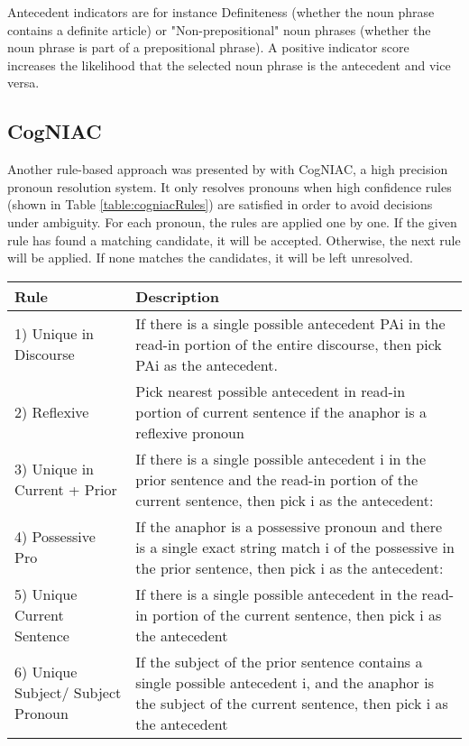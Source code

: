 Antecedent indicators are for instance Definiteness (whether the noun phrase contains a definite article) or "Non-prepositional" noun phrases (whether the noun phrase is part of a prepositional phrase). A positive indicator score increases the likelihood that the selected noun phrase is the antecedent and vice versa.


\subsection{CogNIAC}
Another rule-based approach was presented by \citep{baldwin1997cogniac} with CogNIAC, a high precision pronoun resolution system. It only resolves pronouns when high confidence rules (shown in Table \ref{table:cogniacRules})  are satisfied in order to avoid decisions under ambiguity. For each pronoun, the rules are applied one by one. If the given rule has found a matching candidate, it will be accepted. Otherwise, the next rule will be applied. If none matches the candidates, it will be left unresolved. 


\begin{center}
    \begin{tabular}{| l |p{8cm} |}

    \hline
    Rule & Description \\ \hline
\hline
    1) Unique in Discourse & If there is a single possible antecedent PAi in the read-in portion of the entire discourse, then pick PAi as the antecedent. \\ \hline
    2) Reflexive & Pick nearest possible antecedent in read-in portion of current sentence if the anaphor is a reflexive pronoun \\ \hline
    3) Unique in Current + Prior & If there is a single possible antecedent i in the prior sentence and the read-in portion of the current sentence, then pick i as the antecedent: \\ \hline
    4) Possessive Pro & If the anaphor is a possessive pronoun and there is a single exact string match i of the possessive in the prior sentence, then pick i as the antecedent:  \\ \hline
    5) Unique Current Sentence & If there is a single possible antecedent in the read-in portion of the current sentence, then pick i as the antecedent  \\ \hline
    6) Unique Subject/ Subject Pronoun & If the subject of the prior sentence contains a single possible antecedent i, and the anaphor is the subject of the current sentence, then pick i as the antecedent \\ \hline

    \end{tabular}
     \label{table:cogniacRules}
\end{center}

